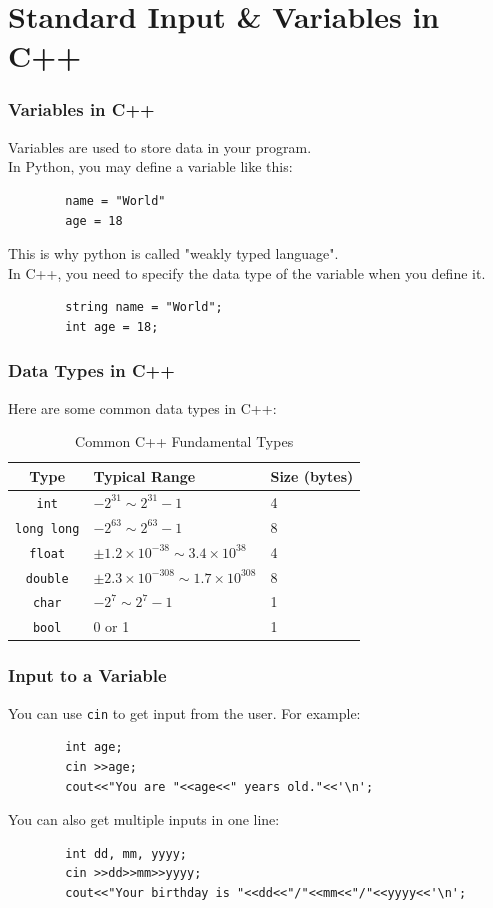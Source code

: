 \documentclass[xcolor=dvipsnames]{beamer}
\begin{document}
    \section{Standard Input \& Variables in C++}
    \begin{frame}[fragile]
        \frametitle{Variables in C++}
        Variables are used to store data in your program.\\
        In Python, you may define a variable like this:
        \begin{verbatim}
        name = "World"
        age = 18
        \end{verbatim}
        This is why python is called "weakly typed language".\\
        In C++, you need to specify the data type of the variable when you define it.
        \begin{verbatim}
        string name = "World";
        int age = 18;
        \end{verbatim}
    \end{frame}

    \begin{frame}
        \frametitle{Data Types in C++}
        Here are some common data types in C++:
        \begin{table}[h]
        \centering
        \caption{Common C++ Fundamental Types}
        \begin{tabular}{cll}
        \toprule
        \textbf{Type} & \textbf{Typical Range} & \textbf{Size (bytes)} \\
        \midrule
        \texttt{int}        & $-2^{31}\sim 2^{31}-1$ & 4 \\
        \texttt{long long}  & $-2^{63}\sim 2^{63}-1$ & 8 \\
        \texttt{float}      & $\pm 1.2 \times 10^{-38}\sim 3.4 \times 10^{38}$ & 4 \\
        \texttt{double}     & $\pm 2.3 \times 10^{-308}\sim 1.7 \times 10^{308}$ & 8 \\
        \texttt{char}       & $-2^7\sim 2^7-1$ & 1 \\
        \texttt{bool}     & 0 or 1 & 1 \\
        \bottomrule
        \end{tabular}
        \end{table}        
    \end{frame}

    \begin{frame}[fragile]
        \frametitle{Input to a Variable}
        You can use \texttt{cin} to get input from the user. For example:
        \begin{verbatim}
        int age;
        cin >>age;
        cout<<"You are "<<age<<" years old."<<'\n';
        \end{verbatim}
        You can also get multiple inputs in one line:
        \begin{verbatim}
        int dd, mm, yyyy;
        cin >>dd>>mm>>yyyy;
        cout<<"Your birthday is "<<dd<<"/"<<mm<<"/"<<yyyy<<'\n';
        \end{verbatim}
    \end{frame}
\end{document}
